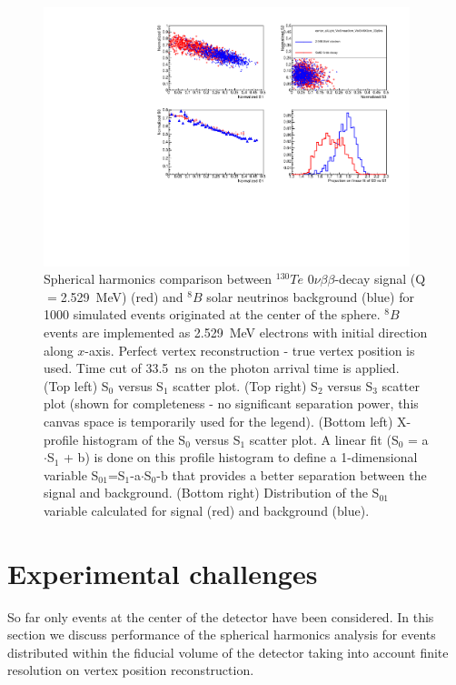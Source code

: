 \documentclass[12pt,twoside,letterpaper]{article}
\newcommand{\vbb}{0\nu\beta\beta}
\newcommand{\Te}{^{130}Te}
\newcommand{\B}{^{8}B}
\begin{document}
\begin{figure}[htb]
\centering
\includegraphics[angle=0,width=0.95\textwidth]{plots/hSLPlots_Te_allLight_VtxSmear0cm_VtxShiftX0cm_33p5ns_center.pdf}
\caption{Spherical harmonics comparison between $\Te$ $\vbb$-decay signal (Q$=$2.529~MeV) (red) and $\B$ solar neutrinos background (blue) for 1000 simulated events originated at the center of the sphere. $\B$ events are implemented as 2.529~MeV electrons with initial direction along $x$-axis. Perfect vertex reconstruction - true vertex position is used. Time cut of 33.5~ns on the photon arrival time is applied. (Top left) S$_0$ versus S$_1$ scatter plot. (Top right) S$_2$ versus S$_3$ scatter plot (shown for completeness - no significant separation power, this canvas space is temporarily used for the legend). (Bottom left) X-profile histogram of the S$_0$ versus S$_1$ scatter plot. A linear fit (S$_0$ = a$\cdot$S$_1$ + b) is done on this profile histogram to define a 1-dimensional variable S$_{01}$=S$_1$-a$\cdot$S$_0$-b that provides a better separation between the signal and background. (Bottom right) Distribution of the S$_{01}$ variable calculated for signal (red) and background (blue).}
\label{fig:SL_Te_33p5ns_center}
\end{figure}


\section{Experimental challenges}

So far only events at the center of the detector have been considered. In this section we discuss performance of the spherical harmonics analysis for events distributed within the fiducial volume of the detector taking into account finite resolution on vertex position reconstruction.
\end{document}
